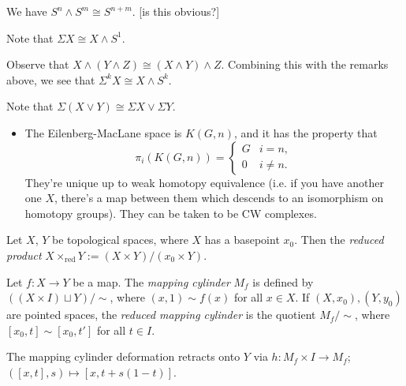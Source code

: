 \documentclass{MetricNotes2023}
\begin{document}
\begin{example}
We have \(S^n \wedge S^m\cong S^{n+m}\). [is this obvious?]
\end{example}

\begin{remark}
Note that \(\Sigma X \cong X\wedge S^1\). 
\end{remark}

\begin{remark}\label{2503311142}
Observe that \(X\wedge (Y\wedge Z)\cong (X\wedge Y)\wedge Z\). Combining this with the remarks above, we see that \(\Sigma^kX\cong X\wedge S^k\). 
\end{remark}

\begin{remark}\label{2502211505}
Note that \(\Sigma(X\vee Y)\cong \Sigma X\vee \Sigma Y\).
\end{remark}

\begin{itemize}
\item The Eilenberg-MacLane space is \(K(G, n)\), and it has the property that 
\[\pi_i(K(G, n))=\begin{cases}
G & i=n,\\
0 & i\neq n.
\end{cases}\]
They're unique up to weak homotopy equivalence (i.e. if you have another one \(X\), there's a map between them which descends to an isomorphism on homotopy groups). They can be taken to be CW complexes. 
\end{itemize}

\begin{definition}
Let \(X\), \(Y\) be topological spaces, where \(X\) has a basepoint \(x_0\). Then the \textit{reduced product} \(X\times_{\text{red}}Y:=(X\times Y)/(x_0 \times Y)\). 
\end{definition}

\begin{definition}
Let \(f : X \to Y\) be a map. The \textit{mapping cylinder} \(M_f\) is defined by \(((X\times I)\sqcup Y)/\sim\), where \((x,1)\sim f(x)\) for all \(x \in X\). If \((X, x_0), (Y, y_0)\) are pointed spaces, the \textit{reduced mapping cylinder} is the quotient \(M_f/\sim\), where \([x_0, t]\sim [x_0, t']\) for all \( t\in I\).
\end{definition}

\begin{remark}\label{2503231306}
The mapping cylinder deformation retracts onto \(Y\) via \(h : M_f \times I\to M_f\); \(([x,t], s)\mapsto [x, t+s(1-t)]\). 
\end{remark}
\end{document}
